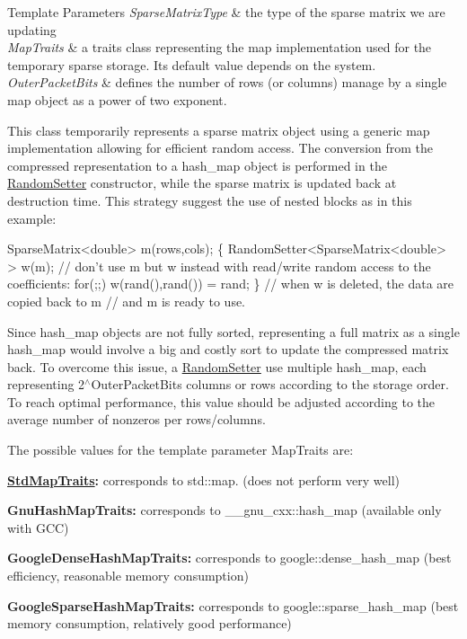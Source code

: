 \begin{DoxyTemplParams}{Template Parameters}
{\em Sparse\+Matrix\+Type} & the type of the sparse matrix we are updating \\
\hline
{\em Map\+Traits} & a traits class representing the map implementation used for the temporary sparse storage. Its default value depends on the system. \\
\hline
{\em Outer\+Packet\+Bits} & defines the number of rows (or columns) manage by a single map object as a power of two exponent.\\
\hline
\end{DoxyTemplParams}
This class temporarily represents a sparse matrix object using a generic map implementation allowing for efficient random access. The conversion from the compressed representation to a hash\+\_\+map object is performed in the \hyperlink{class_eigen_1_1_random_setter}{Random\+Setter} constructor, while the sparse matrix is updated back at destruction time. This strategy suggest the use of nested blocks as in this example\+:


\begin{DoxyCode}
SparseMatrix<double> m(rows,cols);
\{
  RandomSetter<SparseMatrix<double> > w(m);
  \textcolor{comment}{// don't use m but w instead with read/write random access to the coefficients:}
  \textcolor{keywordflow}{for}(;;)
    w(rand(),rand()) = rand;
\}
\textcolor{comment}{// when w is deleted, the data are copied back to m}
\textcolor{comment}{// and m is ready to use.}
\end{DoxyCode}


Since hash\+\_\+map objects are not fully sorted, representing a full matrix as a single hash\+\_\+map would involve a big and costly sort to update the compressed matrix back. To overcome this issue, a \hyperlink{class_eigen_1_1_random_setter}{Random\+Setter} use multiple hash\+\_\+map, each representing 2$^\wedge$\+Outer\+Packet\+Bits columns or rows according to the storage order. To reach optimal performance, this value should be adjusted according to the average number of nonzeros per rows/columns.

The possible values for the template parameter Map\+Traits are\+:
\begin{DoxyItemize}
\item {\bfseries \hyperlink{struct_eigen_1_1_std_map_traits}{Std\+Map\+Traits}\+:} corresponds to std\+::map. (does not perform very well)
\item {\bfseries Gnu\+Hash\+Map\+Traits\+:} corresponds to \+\_\+\+\_\+gnu\+\_\+cxx\+::hash\+\_\+map (available only with G\+CC)
\item {\bfseries Google\+Dense\+Hash\+Map\+Traits\+:} corresponds to google\+::dense\+\_\+hash\+\_\+map (best efficiency, reasonable memory consumption)
\item {\bfseries Google\+Sparse\+Hash\+Map\+Traits\+:} corresponds to google\+::sparse\+\_\+hash\+\_\+map (best memory consumption, relatively good performance)
\end{DoxyItemize}

